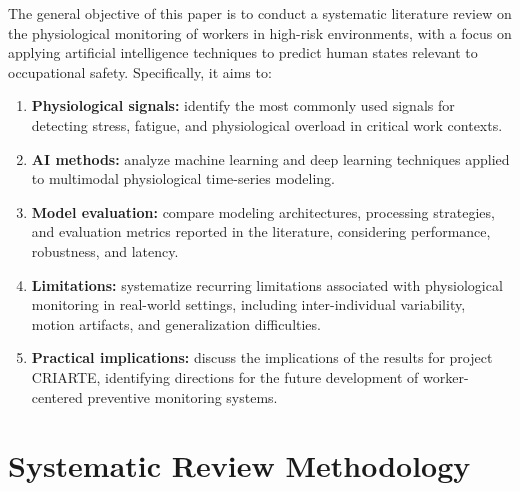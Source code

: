 \documentclass[runningheads]{llncs}
\newcommand{\criarteAcronym}{CRIARTE}
\begin{document}
The general objective of this paper is to conduct a systematic literature review on the physiological monitoring of workers in high-risk environments, with a focus on applying artificial intelligence techniques to predict human states relevant to occupational safety. Specifically, it aims to:
\begin{enumerate}
    \item \textbf{Physiological signals:} identify the most commonly used signals for detecting stress, fatigue, and physiological overload in critical work contexts.
    \item \textbf{AI methods:} analyze machine learning and deep learning techniques applied to multimodal physiological time-series modeling.
    \item \textbf{Model evaluation:} compare modeling architectures, processing strategies, and evaluation metrics reported in the literature, considering performance, robustness, and latency.
    \item \textbf{Limitations:} systematize recurring limitations associated with physiological monitoring in real-world settings, including inter-individual variability, motion artifacts, and generalization difficulties.
    \item \textbf{Practical implications:} discuss the implications of the results for project \criarteAcronym, identifying directions for the future development of worker-centered preventive monitoring systems.
\end{enumerate}

\section{Systematic Review Methodology}


\end{document}
